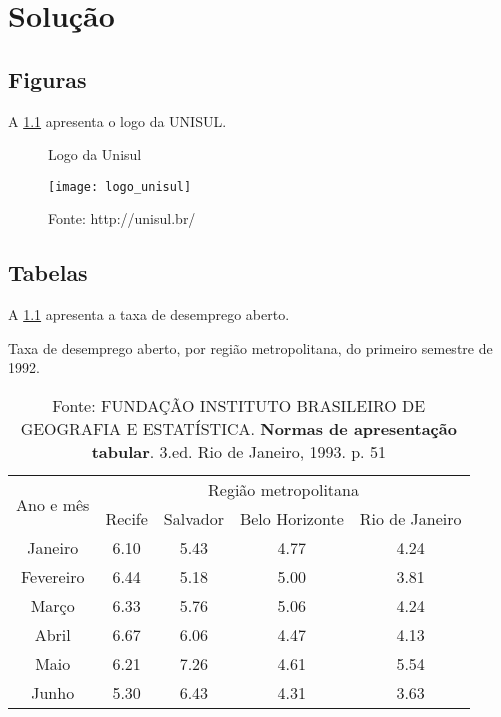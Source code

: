 
\chapter{Solução} \label{ch:solucao}

\section{Figuras} \label{sec:figuras}

A \cref{fig:logo-unisul} apresenta o logo da UNISUL.

\begin{figure}[H]
\centering
\caption{Logo da Unisul}
\label{fig:logo-unisul}
\texttt{[image: logo\_unisul]}
\caption*{Fonte: http://unisul.br/}
\end{figure}

\lipsum[1]

\section{Tabelas} \label{sec:tabelas}

A \cref{tab:taxa-desemprego} apresenta a taxa de desemprego aberto.

\begin{table}[H]
\centering
\caption{Taxa de desemprego aberto, por região metropolitana, do primeiro semestre de 1992.}
\label{tab:taxa-desemprego}
\begin{tabular}{|c|c|c|c|c|}
\hline
\multirow{2}{*}{Ano e mês} & \multicolumn{4}{|c|}{Região metropolitana}          \\ \cline{2-5}
                           & Recife & Salvador & Belo Horizonte & Rio de Janeiro \\ \hline
Janeiro                    & 6.10   & 5.43     & 4.77           & 4.24           \\ \hline
Fevereiro                  & 6.44   & 5.18     & 5.00           & 3.81           \\ \hline
Março                      & 6.33   & 5.76     & 5.06           & 4.24           \\ \hline
Abril                      & 6.67   & 6.06     & 4.47           & 4.13           \\ \hline
Maio                       & 6.21   & 7.26     & 4.61           & 5.54           \\ \hline
Junho                      & 5.30   & 6.43     & 4.31           & 3.63           \\ \hline
\end{tabular}
\caption*{Fonte: FUNDAÇÃO INSTITUTO BRASILEIRO DE GEOGRAFIA E ESTATÍSTICA. \textbf{Normas de apresentação tabular}. 3.ed. Rio de Janeiro, 1993. p. 51}
\end{table}


